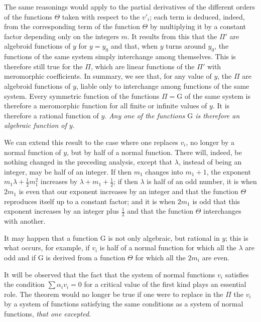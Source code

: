 \documentclass{article}
\begin{document}
The same reasonings would apply to the partial derivatives of the different orders of the functions $\Theta$ taken with respect to the $v'_{i}$; each term is deduced, indeed, from the corresponding term of the function $\Theta$ by multiplying it by a
constant factor depending only on the integers $m$. It results from this that the $\Pi'$ are algebroid functions of $y$ for $y = y_{0}$ and that, when $y$ turns around $y_{0}$, the functions of the same system simply interchange among themselves. This is therefore still true for the $\Pi$, which are linear functions of the $\Pi'$ with meromorphic coefficients. In summary, we see that, for any value of $y$, the $\Pi$ are algebroid functions of $y$, liable only to interchange among functions of the same system. Every symmetric function of the functions $\Pi = \mathrm{G}$ of the same system is therefore a meromorphic function for all finite or infinite values of $y$. It is therefore a rational function of $y$. \emph{Any one of the functions $\mathrm{G}$ is therefore an algebraic function of $y$.}

We can extend this result to the case where one replaces $v_{i}$, no longer by a normal function of $y$, but by half of a normal function. There will, indeed, be nothing changed in the preceding analysis, except that $\lambda$, instead of being an integer, may be half of an integer. If then $m_{1}$ changes into $m_{1} + 1$, the exponent $m_{1}\lambda + \frac{1}{2}m_{1}^{2}$ increases by $\lambda + m_{1} + \frac{1}{2}$; if then $\lambda$ is half of an odd number, it is when $2m_{1}$ is even that our exponent increases by an integer and that the function $\Theta$ reproduces itself up to a constant factor; and it is when $2m_{1}$ is odd that this exponent increases by an integer plus $\frac{1}{2}$ and that the function $\Theta$ interchanges with another.

It may happen that a function $\mathrm{G}$ is not only algebraic, but rational in $y$; this is what occurs, for example, if $v_{i}$ is half of a normal function for which all the $\lambda$ are odd and if $\mathrm{G}$ is derived from a function $\Theta$ for which all the $2m_{i}$ are even.

It will be observed that the fact that the system of normal functions $v_{i}$ satisfies the condition $\displaystyle\sum \alpha_{i} v_{i} = 0$ for a critical value of the first kind plays an essential role. The theorem would no longer be true if one were to replace in the $\Pi$ the $v_{i}$ by a system of functions satisfying the same conditions as a system of normal functions, \emph{that one excepted}.
\end{document}
